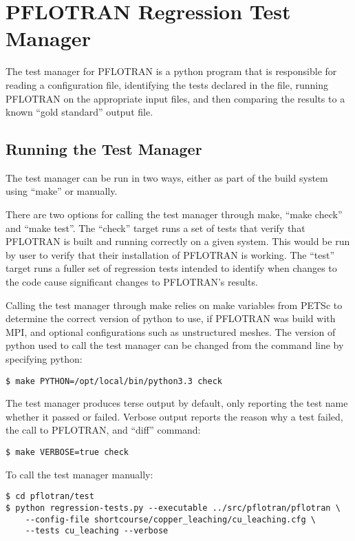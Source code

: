 \section{PFLOTRAN Regression Test Manager}

The test manager for PFLOTRAN is a python program that is responsible
for reading a configuration file, identifying the tests declared in
the file, running PFLOTRAN on the appropriate input files, and then
comparing the results to a known ``gold standard'' output file.

\subsection{Running the Test Manager}
The test manager can be run in two ways, either as part of the build
system using ``make'' or manually.

There are two options for calling the test manager through make,
``make check'' and ``make test''. The ``check'' target runs a set of
tests that verify that PFLOTRAN is built and running correctly on a
given system. This would be run by user to verify that their
installation of PFLOTRAN is working. The ``test'' target runs a fuller
set of regression tests intended to identify when changes to the code
cause significant changes to PFLOTRAN's results.

Calling the test manager through make relies on make variables from
PETSc to determine the correct version of python to use, if PFLOTRAN
was build with MPI, and optional configurations such as unstructured
meshes. The version of python used to call the test manager can be
changed from the command line by specifying python:

\begin{verbatim}
$ make PYTHON=/opt/local/bin/python3.3 check
\end{verbatim}

The test manager produces terse output by default, only reporting the
test name whether it passed or failed. Verbose output reports the
reason why a test failed, the call to PFLOTRAN, and ``diff'' command:

\begin{verbatim}
$ make VERBOSE=true check
\end{verbatim}

To call the test manager manually:
\begin{verbatim}
$ cd pflotran/test
$ python regression-tests.py --executable ../src/pflotran/pflotran \
    --config-file shortcourse/copper_leaching/cu_leaching.cfg \
    --tests cu_leaching --verbose
\end{verbatim}

